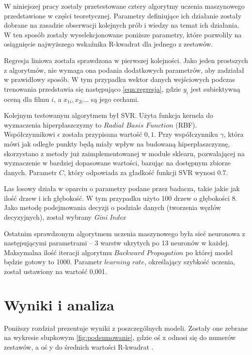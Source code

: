 W niniejszej pracy zostały przetestowane cztery algorytmy uczenia maszynowego przedstawione w części teoretycznej. Parametry definiujące ich działanie zostały dobrane na zasadzie obserwacji kolejnych prób i wiedzy na temat ich działania. W ten sposób zostały wyselekcjonowane poniższe parametry, które pozwoliły na osiągnięcie najwyższego wskaźnika R-kwadrat dla jednego z zestawów.  \par

Regresja liniowa została sprawdzona w pierwszej kolejności. Jako jeden prostszych z algorytmów, nie wymaga ona podania dodatkowych parametrów, aby zadziałał w prawidłowy sposób. W tym przypadku wektor danych wejściowych podczas trenowania przedstawia się  następująco \ref{eqn:regresja}, gdzie $y_i$ jest subiektywną oceną dla filmu $i$, a $x_{1i}, x_{2i}...$ są jego cechami. \par

Kolejnym testowanym algorytmem był SVR. Użyta funkcja kernela do wyznaczenia hiperpłaszczyzny to $Radial$ $Basis$ $Function$ (RBF). Współczynnikowi $\epsilon$ została przypisana wartość $0,1$. Przy współczynniku $\gamma$, która mówi jak odległe punkty będą miały wpływ na budowaną hiperpłaszczyznę, skorzystano z metody już zaimplementowanej w module sklearn, pozwalającej na wyznaczenie w bardziej dopasowane wartości, bazując na dostępnym zbiorze danych. Parametr $C$, który odpowiada za gładkość funkcji SVR wynosi 0.7.\par

Las losowy działa w oparciu o parametry podane przez badacza, takie jakie jak ilość drzew i ich głębokość. W tym przypadku użyto 100 drzew o głębokości 8. Jako metodę podejmowania decyzji o podziale danych (tworzenia węzłów decyzyjnych), został wybrany \emph{Gini Index} \par

Ostatnim sprawdzonym algorytmem uczenia maszynowego była sieć neuronowa z następującymi parametrami -- 3 warstw ukrytych po 13 neuronów w każdej. Maksymalna ilość iteracji algorytmu $Backward$ $Propagation$ po której model będzie gotowy to 1000. Parametr $learning$ $rate$, określający szybkość uczenia, został ustawiony na wartość 0,001.\par


\chapter{Wyniki i analiza }
Poniższy rozdział prezentuje wyniki z poszczególnych modeli. Zostały one zebrane na wykresie słupkowym \ref{fig:podsumowanie}, gdzie oś x odnosi się do numerów zestawów, a oś y do średnich wartości R-kwadrat .


